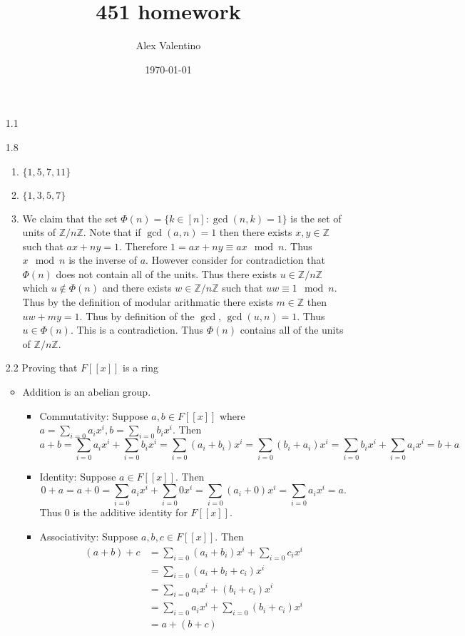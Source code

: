 \documentclass[12pt, letterpaper]{article}
\date{\today}
\author{Alex Valentino}
\title{451 homework}
\newcommand{\Z}{\mathbb{Z}}
\begin{document}
\begin{enumerate}
	\item[1.1]
	\item[1.8]
	\begin{enumerate}
		\item $\{1,5,7,11\}$
		\item $\{1,3,5,7\}$
		\item We claim that the set $\Phi(n) = \{k \in [n]: \gcd(n,k)=1\}$ is the set of units of $\Z/n\Z$.  Note that if $\gcd(a,n)=1$ then there exists 
		$x,y \in \Z$ such that $ax + ny = 1$.  Therefore $1 = ax + ny \equiv ax \mod{n}$.  Thus $x\mod n$ is the inverse of $a$.  However consider 
		for contradiction that $\Phi(n)$ does not contain all of the units.
		Thus there exists $u \in \Z/n\Z$ which $u \not \in \Phi(n)$ and there exists $w \in \Z/n\Z$ such that $uw \equiv 1 \mod{n}$.  Thus by the definition of modular arithmatic there exists $m \in \Z$ then $uw + my = 1$.
		Thus by definition of the $\gcd$, $\gcd(u,n) = 1$.  Thus $u \in \Phi(n)$.  This is a contradiction.  Thus $\Phi(n)$ contains all of the units of $\Z/n\Z$.   
	\end{enumerate}
	\item[2.2] Proving that $F[[x]]$ is a ring
	\begin{itemize}
		\item Addition is an abelian group.
		\begin{itemize}
			\item Commutativity: Suppose $a,b \in F[[x]]$ where 
			$a = \sum_{i=0}a_ix^i, b=\sum_{i=0} b_ix^i$.  Then 
			$$
			a+b = \sum_{i=0}a_ix^i + \sum_{i=0} b_ix^i = \sum_{i=0} (a_i + b_i ) x^i = \sum_{i=0} (b_i + a_i) x^i =  \sum_{i=0} b_ix^i + \sum_{i=0}a_ix^i = b + a
			$$
			\item Identity: Suppose $a \in F[[x]]$.  Then 
			$$
			0 + a = a + 0 = \sum_{i=0}a_ix^i + \sum_{i=0} 0 x^i = 
			\sum_{i=0} (a_i + 0)x^i = \sum_{i=0}a_ix^i = a.
			$$
			Thus $0$ is the additive identity for $F[[x]]$.
			\item Associativity: Suppose $a,b,c \in F[[x]]$.  Then
			\begin{align*}
			(a+b) + c &= \sum_{i=0}(a_i + b_i)x^i + \sum_{i=0}c_ix^i\\
			&= \sum_{i=0}(a_i + b_i + c_i)x^i\\ &= \sum_{i=0}a_ix^i + (b_i + c_i)x^i\\ &= \sum_{i=0}a_ix^i + \sum_{i=0}(b_i + c_i)x^i\\ &= a + (b+c)
			\end{align*}
			

\end{itemize}
\end{itemize}
\end{enumerate}
\end{document}
